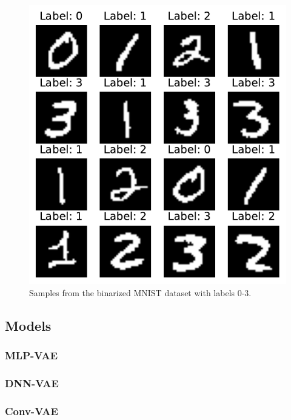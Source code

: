 \begin{figure}[!htb]
\begin{center}\includegraphics[scale=0.7]{latex/figures/bmnist.pdf}
\end{center}
\caption{Samples from the binarized MNIST dataset with labels 0-3.}
\label{fig:bmnist}
\end{figure}


\subsection{Models}
\subsubsection{MLP-VAE}

\subsubsection{DNN-VAE}

\subsubsection{Conv-VAE}

